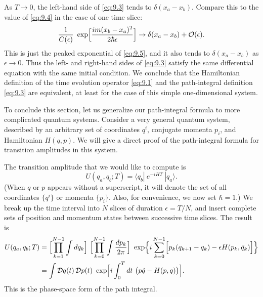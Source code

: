 As $T\to 0$, the left-hand side of \eqref{eq:9.3} tends to
$\delta(x_a-x_b)$.  Compare this to the value of \eqref{eq:9.4} in the case of
one time slice:
\begin{equation}
  \frac{1}{C(\epsilon)}\ \exp\Bigl[ \frac{im(x_b-x_a)^2}{2\hbar\epsilon}
    \Bigr] \to \delta(x_a-x_b) + \mathcal{O}(\epsilon) .
\end{equation}
This is just the peaked exponential of \eqref{eq:9.5}, and it also tends to
$\delta(x_a-x_b)$ as $\epsilon\to 0$.  Thus the left- and right-hand sides of
\eqref{eq:9.3} satisfy the same differential equation with the same initial
condition.  We conclude that the Hamiltonian definition of the time evolution
operator \eqref{eq:9.1} and the path-integral definition \eqref{eq:9.3} are
equivalent, at least for the case of this simple one-dimensional system.

To conclude this section, let us generalize our path-integral formula to more
complicated quantum systems.  Consider a very general quantum system,
described by an arbitrary set of coordinates $q^i$, conjugate momenta $p_i$,
and Hamiltonian $H(q,p)$.  We will give a direct proof of the path-integral
formula for transition amplitudes in this system.

The transition amplitude that we would like to compute is
\begin{equation}
  U(q_a, q_b; T) = \langle q_b|\ e^{-iHT}\ |q_a\rangle .
  \label{eq:9.8}
\end{equation}
(When $q$ or $p$ appears without a superscript, it will denote the set of all
coordinates $\{q^i\}$ or momenta $\{p_i\}$.  Also, for convenience, we now set
$\hbar = 1$.)  We break up the time interval into $N$ slices of duration
$\epsilon = T/N$, and insert complete sets of position and momentum states
between successive time slices.  The result is
\begin{equation}
  \begin{aligned}
    U(q_a, q_b; T) &= \Bigl[ \prod_{k=1}^{N-1}\int dq_k \Bigr]\
      \Bigl[ \prod_{k=0}^{N-1}\int \frac{dp_k}{2\pi} \Bigr]\
      \exp\Bigl\{ i\sum_{k=0}^{N-1}\Bigl[ p_k(q_{k+1}-q_k)
        - \epsilon H(p_k, \bar{q}_k) \Bigr] \Bigr\}\\
    &= \int \mathcal{D}q(t)\,\mathcal{D}p(t)\ \exp\Bigl[ i\int_0^T dt\
      \bigl( p\dot{q} - H(p,q) \bigr) \Bigr] .
  \end{aligned}
  \label{eq:9.12}
\end{equation}
This is the phase-space form of the path integral.

